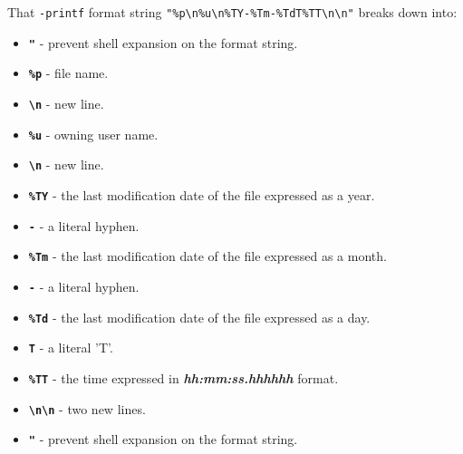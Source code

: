 \documentclass[10pt,american,]{book}
\newenvironment{Shaded}{\begin{snugshade}}{\end{snugshade}}
\newcommand{\KeywordTok}[1]{\textcolor[rgb]{0.13,0.29,0.53}{\textbf{{#1}}}}
\newcommand{\StringTok}[1]{\textcolor[rgb]{0.31,0.60,0.02}{{#1}}}
\newcommand{\NormalTok}[1]{{#1}}
\providecommand{\tightlist}{%
  \setlength{\itemsep}{0pt}\setlength{\parskip}{0pt}}
\numberwithin{figure}{chapter}
\renewcommand{\KeywordTok}[1]{{#1}}
\renewcommand{\StringTok}[1]{{#1}}
\renewcommand{\NormalTok}[1]{{#1}}
\begin{document}
\begin{Shaded}
\end{Shaded}

That \texttt{-printf} format string
\texttt{"\%p\textbackslash{}n\%u\textbackslash{}n\%TY-\%Tm-\%TdT\%TT\textbackslash{}n\textbackslash{}n"}
breaks down into: 

\begin{itemize}
\tightlist
\item
  \textbf{\texttt{"}} - prevent shell expansion on the format string.
\item
  \textbf{\texttt{\%p}} - file name.
\item
  \textbf{\texttt{\textbackslash{}n}} - new line.
\item
  \textbf{\texttt{\%u}} - owning user name.
\item
  \textbf{\texttt{\textbackslash{}n}} - new line.
\item
  \textbf{\texttt{\%TY}} - the last modification date of the file
  expressed as a year.
\item
  \textbf{\texttt{-}} - a literal hyphen.
\item
  \textbf{\texttt{\%Tm}} - the last modification date of the file
  expressed as a month.
\item
  \textbf{\texttt{-}} - a literal hyphen.
\item
  \textbf{\texttt{\%Td}} - the last modification date of the file
  expressed as a day.
\item
  \textbf{\texttt{T}} - a literal 'T'.
\item
  \textbf{\texttt{\%TT}} - the time expressed in
  \textbf{\emph{hh:mm:ss.hhhhhh}} format.
\item
  \textbf{\texttt{\textbackslash{}n\textbackslash{}n}} - two new lines.
\item
  \textbf{\texttt{"}} - prevent shell expansion on the format string.
\end{itemize}
\end{document}

